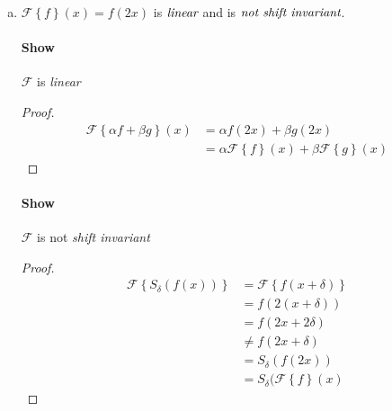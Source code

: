 \documentclass{paper}
\begin{document}
\begin{enumerate}[(a)]
\paragraph{Show} $\mathcal{F}$ is \emph{shift invariant} \\
\begin{proof}
\begin{align*}
    \mathcal{F} \left \{S_\delta (f(x)) \right\} 
    &= \mathcal{F} \left\{ f(x+\delta) \right\} \\
    &= \sum_{k=x-1+\delta}^{x+2+\delta} f(k) \\
    &= S_{\delta}(\sum_{k=x-1}^{x+2} f(k)) \\
    &= S_\delta(\mathcal{F}\left \{f \right\}(x)
\end{align*}
\end{proof}

\item $\mathcal{F} \left \{ f \right\} (x) = f(2x)$ is $\emph{linear}$ and is $\emph{not shift invariant}$.

\paragraph{Show} $\mathcal{F}$ is \emph{linear} \\
\begin{proof}
\begin{align*}
    \mathcal{F} \left \{\alpha f + \beta g \right\}(x)
    &= \alpha f(2x) + \beta g(2x) \\
    &= \alpha \mathcal{F} \left \{f\right\}(x) + \beta \mathcal{F} \left \{g \right\}(x)
\end{align*}
\end{proof}

\paragraph{Show} $\mathcal{F}$ is not \emph{shift invariant} \\
\begin{proof}
\begin{align*}
    \mathcal{F} \left \{S_\delta (f(x)) \right\} 
    &= \mathcal{F} \left\{ f(x+\delta) \right\} \\
    &= f(2(x+\delta)) \\
    &= f(2x + 2\delta) \\
    &\neq f(2x + \delta) \\
    &= S_\delta (f(2x)) \\
    &= S_\delta(\mathcal{F}\left \{f \right\}(x)
\end{align*}
\end{proof}



\end{enumerate}
\end{document}

